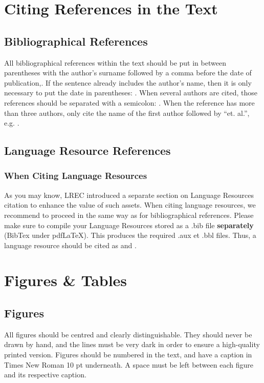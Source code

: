 \documentclass[10pt, a4paper]{article}
\begin{document}
\section{Citing References in the Text}

\subsection{Bibliographical References}

All bibliographical references within the text should be put in between parentheses with the author's surname followed by a comma before the date of publication,\cite{Martin-90}. If the sentence already includes the author's name, then it is only necessary to put the date in parentheses: . When several authors are cited, those references should be
separated with a semicolon: \cite{Martin-90,CastorPollux-92}. When the reference has more than three authors, only cite the name of the first author followed by ``et. al.'', e.g. \cite{Superman-Batman-Catwoman-Spiderman-00}.

\subsection{Language Resource References}

\subsubsection{When Citing Language Resources}
As you may know, LREC introduced a separate section on Language Resources citation to enhance the value of such assets. When citing language resources, we recommend to proceed in the same way as for bibliographical references. Please make sure to compile your Language Resources stored as a .bib file \textbf{separately} (BibTex under pdfLaTeX). This produces the required .aux et .bbl files. Thus, a language resource should be cited as  and  .

\section{Figures \& Tables}
\subsection{Figures}

All figures should be centred and clearly distinguishable. They should never be drawn by hand, and the lines must be very dark in order to ensure a high-quality printed version. Figures should be numbered in the text, and have a caption in Times New Roman 10 pt underneath. A space must be left between each figure and its respective caption. 
\end{document}
